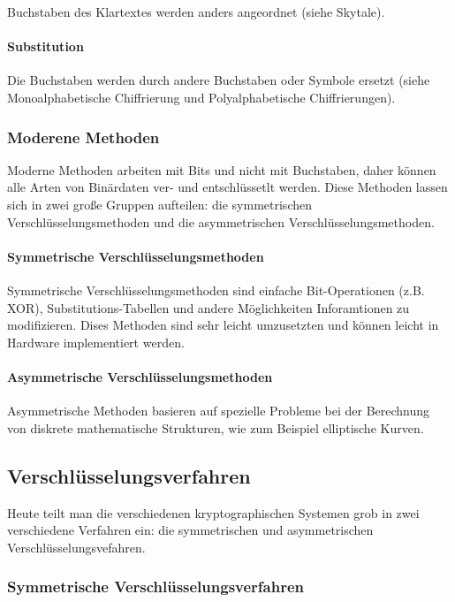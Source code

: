 \documentclass[12pt,a4paper]{report}
\begin{document}
\begin{onehalfspace}
Buchstaben des Klartextes werden anders angeordnet (siehe Skytale).

\paragraph{Substitution}

Die Buchstaben werden durch andere Buchstaben oder Symbole ersetzt (siehe Monoalphabetische Chiffrierung und Polyalphabetische Chiffrierungen).

\subsubsection{Moderene Methoden}

Moderne Methoden arbeiten mit Bits und nicht mit Buchstaben, daher können alle Arten von Binärdaten ver- und entschlüssetlt werden. Diese Methoden lassen sich in zwei große Gruppen aufteilen: die symmetrischen Verschlüsselungsmethoden und die asymmetrischen Verschlüsselungsmethoden.

\paragraph{Symmetrische Verschlüsselungsmethoden}

Symmetrische Verschlüsselungsmethoden sind einfache Bit-Operationen (z.B. XOR), Substitutions-Tabellen und andere Möglichkeiten Inforamtionen zu modifizieren. Dises Methoden sind sehr leicht umzusetzten und können leicht in Hardware implementiert werden.

\paragraph{Asymmetrische Verschlüsselungsmethoden} 

Asymmetrische Methoden basieren auf spezielle Probleme bei der Berechnung von diskrete mathematische Strukturen, wie zum Beispiel elliptische Kurven.

\subsection{Verschlüsselungsverfahren}

Heute teilt man die verschiedenen kryptographischen Systemen grob in zwei verschiedene Verfahren ein: die symmetrischen und asymmetrischen Verschlüsselungsvefahren.

\subsubsection{Symmetrische Verschlüsselungsverfahren}


\end{onehalfspace}
\end{document}
